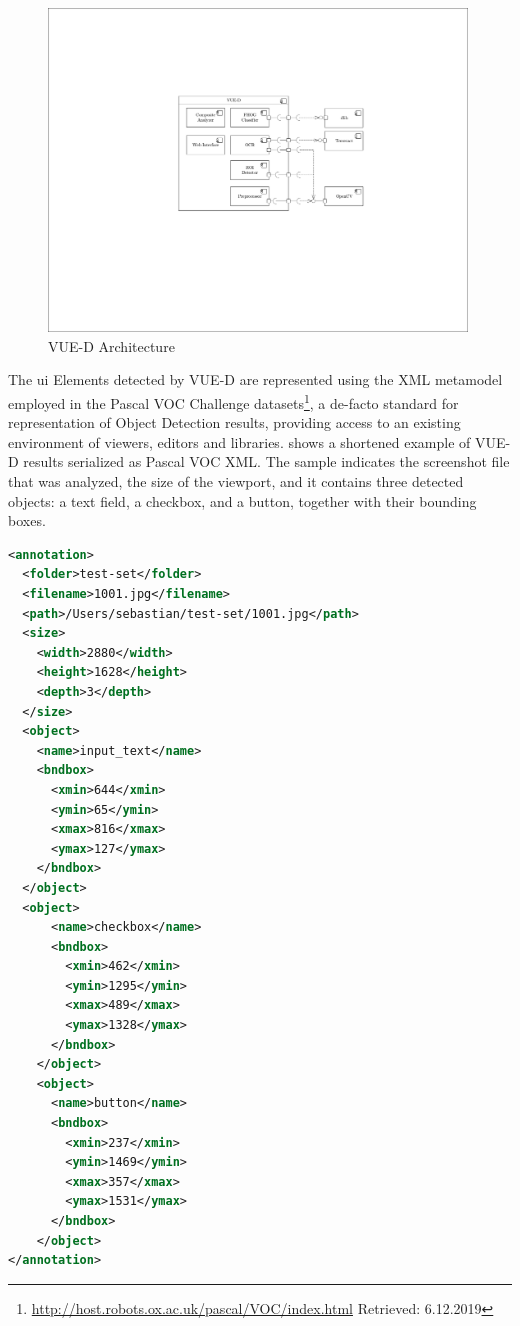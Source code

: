 \begin{figure}[h]
\hypertarget{fig:ci-vued-architecture}{%
\centering
\includegraphics[width=0.99\textwidth]{../figures/awsm-ci-vued-architecture.pdf}
\caption{VUE-D Architecture}\label{fig:ci-vued-architecture}
}
\end{figure}

The \gls{ui} Elements detected by VUE-D are represented using the XML metamodel employed in the Pascal VOC Challenge datasets\footnote{\url{http://host.robots.ox.ac.uk/pascal/VOC/index.html} Retrieved: 6.12.2019}, a de-facto standard for representation of Object Detection results, providing access to an existing environment of viewers, editors and libraries.
 shows a shortened example of VUE-D results serialized as Pascal VOC XML.
The sample indicates the screenshot file that was analyzed, the size of the viewport, and it contains three detected objects: a text field, a checkbox, and a button, together with their bounding boxes.

\begin{lstlisting}[language=xml, captionpos=t, caption=VUE-D Detection Results (shortened) represented as Pascal VOC model, label=lst:pascalvoc]
<annotation>
  <folder>test-set</folder>
  <filename>1001.jpg</filename>
  <path>/Users/sebastian/test-set/1001.jpg</path>
  <size>
    <width>2880</width>
    <height>1628</height>
    <depth>3</depth>
  </size>
  <object>
    <name>input_text</name>
    <bndbox>
      <xmin>644</xmin>
      <ymin>65</ymin>
      <xmax>816</xmax>
      <ymax>127</ymax>
    </bndbox>
  </object>
  <object>
      <name>checkbox</name>
      <bndbox>
        <xmin>462</xmin>
        <ymin>1295</ymin>
        <xmax>489</xmax>
        <ymax>1328</ymax>
      </bndbox>
    </object>
    <object>
      <name>button</name>
      <bndbox>
        <xmin>237</xmin>
        <ymin>1469</ymin>
        <xmax>357</xmax>
        <ymax>1531</ymax>
      </bndbox>
    </object>
</annotation>
\end{lstlisting}

